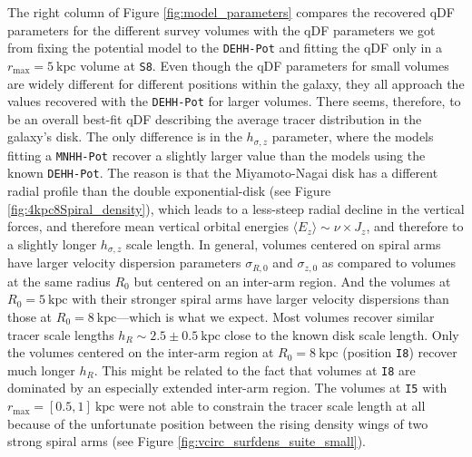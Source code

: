 \documentclass[iop,revtex4,numberedappendix,appendixfloats]{emulateapj}
\begin{document}
The right column of Figure \ref{fig:model_parameters} compares the recovered qDF parameters for the different survey volumes with the qDF parameters we got from fixing the potential model to the \texttt{DEHH-Pot} and fitting the qDF only in a $r_\text{max}=5~\text{kpc}$ volume at \texttt{S8}. Even though the qDF parameters for small volumes are widely different for different positions within the galaxy, they all approach the values recovered with the \texttt{DEHH-Pot} for larger volumes. There seems, therefore, to be an overall best-fit qDF describing the average tracer distribution in the galaxy's disk. The only difference is in the $h_{\sigma,z}$ parameter, where the models fitting a \texttt{MNHH-Pot} recover a slightly larger value than the models using the known \texttt{DEHH-Pot}. The reason is that the Miyamoto-Nagai disk has a different radial profile than the double exponential-disk (see Figure \ref{fig:4kpc8Spiral_density}), which leads to a less-steep radial decline in the vertical forces, and therefore mean vertical orbital energies $\langle E_z \rangle \sim \nu \times J_z$, and therefore to a slightly longer $h_{\sigma,z}$ scale length. In general, volumes centered on spiral arms have larger velocity dispersion parameters $\sigma_{R,0}$ and $\sigma_{z,0}$ as compared to volumes at the same radius $R_0$ but centered on an inter-arm region. And the volumes at $R_0=5~\text{kpc}$ with their stronger spiral arms have larger velocity dispersions than those at $R_0=8~\text{kpc}$---which is what we expect. Most volumes recover similar tracer scale lengths $h_R\sim2.5\pm0.5~\text{kpc}$ close to the known disk scale length. Only the volumes centered on the inter-arm region at $R_0=8~\text{kpc}$ (position \texttt{I8}) recover much longer $h_R$. This might be related to the fact that volumes at \texttt{I8} are dominated by an especially extended inter-arm region. The volumes at \texttt{I5} with $r_\text{max}=[0.5,1]~\text{kpc}$ were not able to constrain the tracer scale length at all because of the unfortunate position between the rising density wings of two strong spiral arms (see Figure \ref{fig:vcirc_surfdens_suite_small}).
\end{document}
